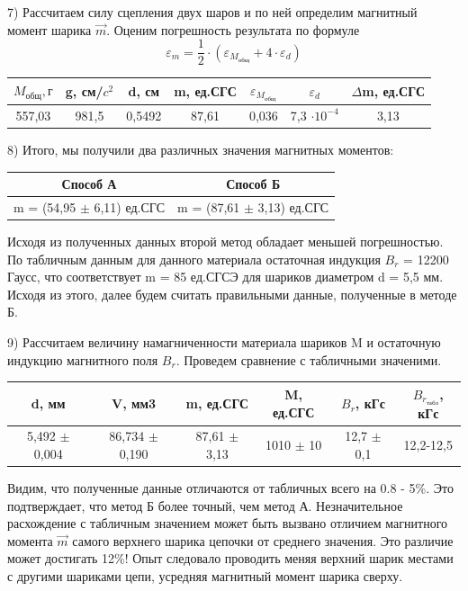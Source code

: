 \documentclass[a4paper,12pt]{article}
\begin{document}
7) Рассчитаем силу сцепления двух шаров и по ней определим магнитный момент шарика $\vec{m}$. Оценим погрешность результата по формуле $$ \varepsilon_m = \frac{1}{2} \cdot (\varepsilon_{M_{общ}} + 4 \cdot \varepsilon_d) $$

\begin{center}
\begin{tabular}{|c|c|c|c|c|c|c|}
	\hline
	$M_{общ}, г$ & g, см/$c^2$ & d, см & m, ед.СГС & $\varepsilon_{M_{общ}}$ & $\varepsilon_d$ & $\Delta$m, ед.СГС \\
	\hline
	557,03 & 981,5 & 0,5492 & 87,61 & 0,036 & 7,3 $\cdot 10^{-4}$ & 3,13 \\
	\hline
\end{tabular}
\end{center}

8) Итого, мы получили два различных значения магнитных моментов: 
\begin{center}
\begin{tabular}{|c|c|}
	\hline
	Способ А & Способ Б \\
	\hline
	m = (54,95 $\pm$ 6,11) ед.СГС & m = (87,61 $\pm$ 3,13) ед.СГС \\
	\hline
\end{tabular}
\end{center}

Исходя из полученных данных второй метод обладает меньшей погрешностью. 
По табличным данным для данного материала остаточная индукция $B_r$ = 12200 Гаусс, что соответствует m = 85 ед.СГСЭ для шариков диаметром d = 5,5 мм. 
Исходя из этого, далее будем считать правильными данные, полученные в методе Б.

9) Рассчитаем величину намагниченности материала шариков M и остаточную индукцию магнитного поля $B_r$. Проведем сравнение с табличными значеними. 

\begin{center}
\begin{tabular}{|c|c|c|c|c|c|}
	\hline
	d, мм & V, мм3 & m, ед.СГС & M, ед.СГС & $B_r$, кГс & $B_{r_{табл}}$, кГс \\
	\hline
	5,492 $\pm$ 0,004 & 86,734 $\pm$ 0,190 & 87,61 $\pm$ 3,13 & 1010 $\pm$ 10 & 12,7 $\pm$ 0,1 & 12,2-12,5\\
	\hline
\end{tabular}
\end{center}

Видим, что полученные данные отличаются от табличных всего на 0.8 - 5\%. Это подтверждает, что метод Б более точный, чем метод А. Незначительное расхождение с табличным значением может быть вызвано отличием магнитного момента $\vec{m}$ самого верхнего шарика цепочки от среднего значения. Это различие может достигать 12\%! Опыт следовало проводить меняя верхний шарик местами с другими шариками цепи, усредняя магнитный момент шарика сверху.
\end{document}

